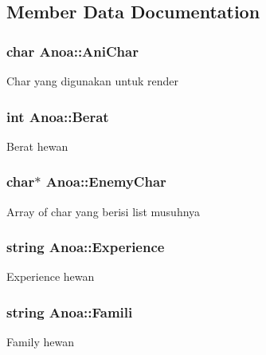 \subsection{Member Data Documentation}
\subsubsection[{\texorpdfstring{Ani\+Char}{AniChar}}]{\setlength{\rightskip}{0pt plus 5cm}char Anoa\+::\+Ani\+Char\hspace{0.3cm}{\ttfamily [protected]}}\hypertarget{class_anoa_a4bfb9cb19e5c6c784d8e60b060f7fa7f}{}\label{class_anoa_a4bfb9cb19e5c6c784d8e60b060f7fa7f}
Char yang digunakan untuk render 
\subsubsection[{\texorpdfstring{Berat}{Berat}}]{\setlength{\rightskip}{0pt plus 5cm}int Anoa\+::\+Berat\hspace{0.3cm}{\ttfamily [protected]}}\hypertarget{class_anoa_ace1d7758a5e8371a22b23fecbf9152e7}{}\label{class_anoa_ace1d7758a5e8371a22b23fecbf9152e7}
Berat hewan 
\subsubsection[{\texorpdfstring{Enemy\+Char}{EnemyChar}}]{\setlength{\rightskip}{0pt plus 5cm}char$\ast$ Anoa\+::\+Enemy\+Char\hspace{0.3cm}{\ttfamily [protected]}}\hypertarget{class_anoa_abc7657c0df0c0a08b69c9fd9213442f2}{}\label{class_anoa_abc7657c0df0c0a08b69c9fd9213442f2}
Array of char yang berisi list musuhnya 
\subsubsection[{\texorpdfstring{Experience}{Experience}}]{\setlength{\rightskip}{0pt plus 5cm}string Anoa\+::\+Experience\hspace{0.3cm}{\ttfamily [protected]}}\hypertarget{class_anoa_a6791e3fbe425ec1b478dcf2544c039aa}{}\label{class_anoa_a6791e3fbe425ec1b478dcf2544c039aa}
Experience hewan 
\subsubsection[{\texorpdfstring{Famili}{Famili}}]{\setlength{\rightskip}{0pt plus 5cm}string Anoa\+::\+Famili\hspace{0.3cm}{\ttfamily [protected]}}\hypertarget{class_anoa_a70b854fa12421457338081ff66e23b3c}{}\label{class_anoa_a70b854fa12421457338081ff66e23b3c}
Family hewan 
